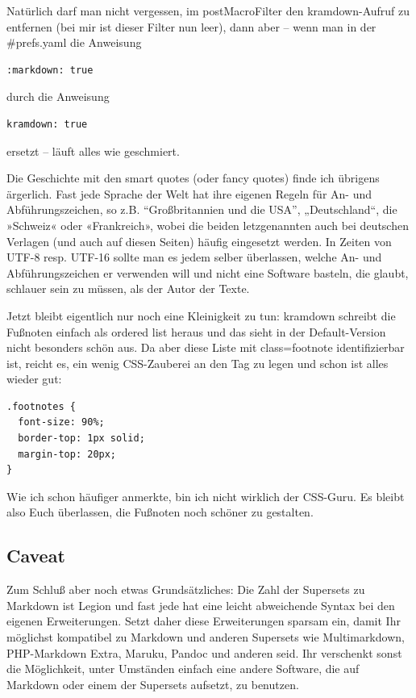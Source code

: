 \documentclass[11pt]{report}
\begin{document}
Natürlich darf man nicht vergessen, im postMacroFilter den
kramdown-Aufruf zu entfernen (bei mir ist dieser Filter nun leer),
dann aber – wenn man in der \#prefs.yaml die Anweisung


\begin{verbatim}
:markdown: true
\end{verbatim}

durch die Anweisung


\begin{verbatim}
kramdown: true
\end{verbatim}

ersetzt – läuft alles wie geschmiert.

Die Geschichte mit den smart quotes (oder fancy quotes) finde ich
übrigens ärgerlich. Fast jede Sprache der Welt hat ihre eigenen Regeln
für An- und Abführungszeichen, so z.B. “Großbritannien und die USA”,
„Deutschland“, die »Schweiz« oder «Frankreich», wobei die beiden
letzgenannten auch bei deutschen Verlagen (und auch auf diesen Seiten)
häufig eingesetzt werden. In Zeiten von UTF-8 resp. UTF-16 sollte man
es jedem selber überlassen, welche An- und Abführungszeichen er
verwenden will und nicht eine Software basteln, die glaubt, schlauer
sein zu müssen, als der Autor der Texte.


Jetzt bleibt eigentlich nur noch eine Kleinigkeit zu tun: kramdown
schreibt die Fußnoten einfach als ordered list heraus und das sieht in
der Default-Version nicht besonders schön aus. Da aber diese Liste mit
class=footnote identifizierbar ist, reicht es, ein wenig CSS-Zauberei
an den Tag zu legen und schon ist alles wieder gut:


\begin{verbatim}
.footnotes {
  font-size: 90%;
  border-top: 1px solid;
  margin-top: 20px;
}
\end{verbatim}

Wie ich schon häufiger anmerkte, bin ich nicht wirklich der
CSS-Guru. Es bleibt also Euch überlassen, die Fußnoten noch schöner zu
gestalten.
\subsection{Caveat}
\label{sec-2-7-2-1}


Zum Schluß aber noch etwas Grundsätzliches: Die Zahl der Supersets zu
Markdown ist Legion und fast jede hat eine leicht abweichende Syntax
bei den eigenen Erweiterungen. Setzt daher diese Erweiterungen sparsam
ein, damit Ihr möglichst kompatibel zu Markdown und anderen Supersets
wie Multimarkdown, PHP-Markdown Extra, Maruku, Pandoc und anderen
seid. Ihr verschenkt sonst die Möglichkeit, unter Umständen einfach
eine andere Software, die auf Markdown oder einem der Supersets
aufsetzt, zu benutzen.
\end{document}
